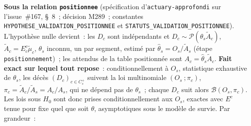 \documentclass[a4paper,11pt]{article}
\newcommand{\code}[1]{\texttt{\small #1}}
\begin{document}
\medskip
\noindent
\textbf{Sous la relation \code{positionnee}} (spécification
d'\code{actuary-approfondi} sur l'issue~\#167, §~8~; décision M289~;
constantes \code{HYPOTHESE\_VALIDATION\_POSITIONNEE} et
\code{STATUTS\_VALIDATION\_POSITIONNEE}). L'hypothèse nulle devient~: les
$D_c$ sont indépendants et $D_c \sim \mathcal{P}(\theta_s \tilde A_c)$,
$\tilde A_c = E^c_c \tilde\mu_c$, $\theta_s$ inconnu, un par segment,
estimé par $\hat\theta_s = O_s / \tilde A_s$ (étape \code{positionnement})~;
les attendus de la table positionnée sont $A_c = \hat\theta_s \tilde A_c$.
\textbf{Fait exact sur lequel tout repose}~: conditionnellement à $O_s$,
statistique exhaustive de $\theta_s$, les décès $(D_c)_{c \in C^{+}_s}$
suivent la loi multinomiale $(O_s~; \pi_c)$, $\pi_c = \tilde A_c / \tilde
A_s = A_c / A_s$, qui ne dépend pas de $\theta_s$~; chaque $D_c$ suit
alors $\mathcal{B}(O_s, \pi_c)$. Les lois sous $H_0$ sont donc prises
conditionnellement aux $O_s$, exactes avec $E^c$ tenue pour fixe quel que
soit $\theta$, asymptotiques sous le modèle de survie. Par grandeur~:
\end{document}
